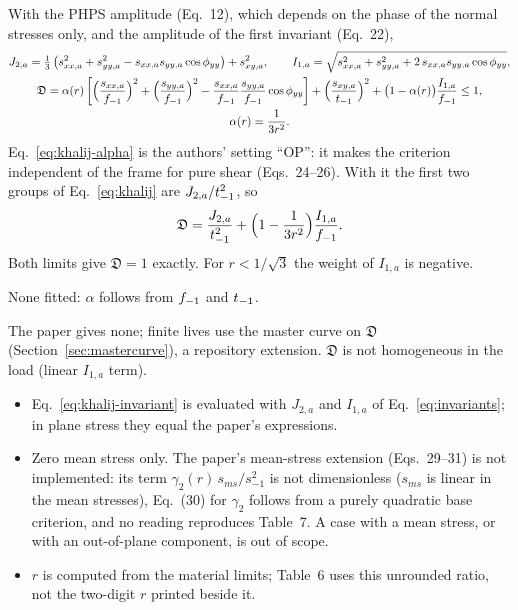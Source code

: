  With the PHPS amplitude (Eq.~12), which depends on the phase of the normal
stresses only, and the amplitude of the first invariant (Eq.~22),
\begin{gather}
J_{2,a} = \tfrac13\left(s_{xx,a}^2 + s_{yy,a}^2 - s_{xx,a}s_{yy,a}\cos\phi_{yy}\right) + s_{xy,a}^2 ,\qquad
I_{1,a} = \sqrt{s_{xx,a}^2 + s_{yy,a}^2 + 2\,s_{xx,a}s_{yy,a}\cos\phi_{yy}} ,\\
\mathfrak D = \alpha(r)\left[\Bigl(\frac{s_{xx,a}}{f_{-1}}\Bigr)^2 + \Bigl(\frac{s_{yy,a}}{f_{-1}}\Bigr)^2
 - \frac{s_{xx,a}}{f_{-1}}\frac{s_{yy,a}}{f_{-1}}\cos\phi_{yy}\right]
 + \Bigl(\frac{s_{xy,a}}{t_{-1}}\Bigr)^2 + \bigl(1-\alpha(r)\bigr)\frac{I_{1,a}}{f_{-1}} \le 1 ,
 \label{eq:khalij}\\
\alpha(r) = \frac{1}{3r^2} . \label{eq:khalij-alpha}
\end{gather}
Eq.~\eqref{eq:khalij-alpha} is the authors' setting ``OP'': it makes the criterion independent of
the frame for pure shear (Eqs.~24--26). With it the first two groups of Eq.~\eqref{eq:khalij} are
$J_{2,a}/t_{-1}^2$, so
\begin{equation}
\mathfrak D = \frac{J_{2,a}}{t_{-1}^2} + \Bigl(1 - \frac{1}{3r^2}\Bigr)\frac{I_{1,a}}{f_{-1}} .
\label{eq:khalij-invariant}
\end{equation}
Both limits give $\mathfrak D=1$ exactly. For $r<1/\sqrt3$ the weight of $I_{1,a}$ is negative.

 None fitted: $\alpha$ follows from $f_{-1}$ and $t_{-1}$.

 The paper gives none; finite lives use the master curve on $\mathfrak D$
(Section~\ref{sec:mastercurve}), a repository extension. $\mathfrak D$ is not homogeneous in the
load (linear $I_{1,a}$ term).

\begin{itemize}
\item Eq.~\eqref{eq:khalij-invariant} is evaluated with $J_{2,a}$ and $I_{1,a}$ of
  Eq.~\eqref{eq:invariants}; in plane stress they equal the paper's expressions.
\item Zero mean stress only. The paper's mean-stress extension (Eqs.~29--31) is not implemented:
  its term $\gamma_2(r)\,s_{ms}/s_{-1}^2$ is not dimensionless ($s_{ms}$ is linear in the mean
  stresses), Eq.~(30) for $\gamma_2$ follows from a purely quadratic base criterion, and no reading
  reproduces Table~7. A case with a mean stress, or with an out-of-plane component, is out of scope.
\item $r$ is computed from the material limits; Table~6 uses this unrounded ratio, not the
  two-digit $r$ printed beside it.
\end{itemize}

